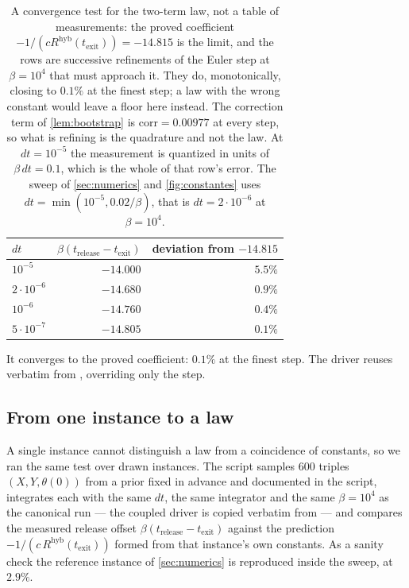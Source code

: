 \documentclass[11pt]{article}
\theoremstyle{definition}
\theoremstyle{remark}
\newcommand{\texit}{t_{\mathrm{exit}}}
\newcommand{\trel}{t_{\mathrm{release}}}
\newcommand{\hyb}{\mathrm{hyb}}
\begin{document}
\begin{table}[t]
\centering
\caption{A convergence test for the two-term law, not a table of measurements:
the proved coefficient $-1/(cR^{\hyb}(\texit))=-14.815$ is the limit, and the
rows are successive refinements of the Euler step at $\beta=10^{4}$ that must
approach it. They do, monotonically, closing to $0.1\%$ at the finest step; a law
with the wrong constant would leave a floor here instead. The
correction term of \cref{lem:bootstrap} is $\mathrm{corr}=0.00977$ at every step,
so what is refining is the quadrature and not the law. At $dt=10^{-5}$ the
measurement is quantized in units of $\beta\,dt=0.1$, which is the whole of that
row's error. The sweep of \cref{sec:numerics} and \cref{fig:constantes} uses
$dt=\min(10^{-5},0.02/\beta)$, that is $dt=2\cdot10^{-6}$ at $\beta=10^{4}$.}
\label{tab:dt}
\begin{tabular}{@{}lrr@{}}
\toprule
$dt$ & $\beta(\trel-\texit)$ & deviation from $-14.815$ \\
\midrule
$10^{-5}$          & $-14.000$ & $5.5\%$ \\
$2\cdot10^{-6}$    & $-14.680$ & $0.9\%$ \\
$10^{-6}$          & $-14.760$ & $0.4\%$ \\
$5\cdot10^{-7}$    & $-14.805$ & $0.1\%$ \\
\bottomrule
\end{tabular}
\end{table}

\noindent It converges to the proved coefficient: $0.1\%$ at the finest step.
The driver reuses  verbatim from
, overriding only the step.

\subsection{From one instance to a law}\label{sec:sweep}

A single instance cannot distinguish a law from a coincidence of constants, so
we ran the same test over drawn instances. The script 
samples 600 triples $(X,Y,\theta(0))$ from a prior fixed in advance and
documented in the script, integrates each with the same $dt$, the same
integrator and the same $\beta=10^{4}$ as the canonical run --- the coupled
driver is copied verbatim from  --- and compares the
measured release offset $\beta(\trel-\texit)$ against the prediction
$-1/(c\,R^{\hyb}(\texit))$ formed from that instance's own constants. As a
sanity check the reference instance of \cref{sec:numerics} is reproduced inside
the sweep, at $2.9\%$.
\end{document}
